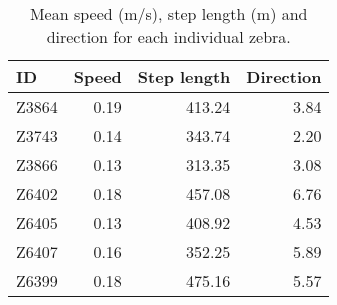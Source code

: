 \begin{table}[H]
\centering
\caption[Movement summary of each individual, NA]{Mean speed (m/s), step length (m) and direction 
                                         for each individual zebra.} 
\label{table:summary_zebras_NA}
\begin{tabular}{lrrr}
  \hline
ID & Speed & Step length & Direction \\ 
  \hline
Z3864 & 0.19 & 413.24 & 3.84 \\ 
  Z3743 & 0.14 & 343.74 & 2.20 \\ 
  Z3866 & 0.13 & 313.35 & 3.08 \\ 
  Z6402 & 0.18 & 457.08 & 6.76 \\ 
  Z6405 & 0.13 & 408.92 & 4.53 \\ 
  Z6407 & 0.16 & 352.25 & 5.89 \\ 
  Z6399 & 0.18 & 475.16 & 5.57 \\ 
   \hline
\end{tabular}
\end{table}
